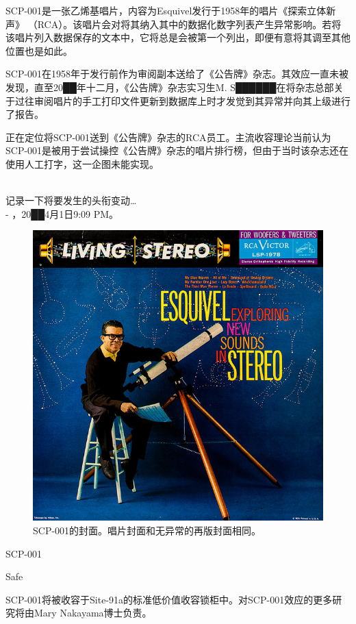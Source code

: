 SCP-001是一张乙烯基唱片，内容为Esquivel发行于1958年的唱片《探索立体新声》 （RCA）。该唱片会对将其纳入其中的数据化数字列表产生异常影响。若将该唱片列入数据保存的文本中，它将总是会被第一个列出，即便有意将其调至其他位置也是如此。

SCP-001在1958年于发行前作为审阅副本送给了《公告牌》杂志。其效应一直未被发现，直至20██年十二月，《公告牌》杂志实习生M. S██████在将杂志总部关于过往审阅唱片的手工打印文件更新到数据库上时才发觉到其异常并向其上级进行了报告。

正在定位将SCP-001送到《公告牌》杂志的RCA员工。主流收容理论当前认为SCP-001是被用于尝试操控《公告牌》杂志的唱片排行榜，但由于当时该杂志还在使用人工打字，这一企图未能实现。


\newpage



\begin{scpbox}
 \\
记录一下将要发生的头衔变动… \\
- ，20██4月1日9:09 PM。
\end{scpbox}

\begin{figure}[H]
	\centering
	\includegraphics[width=0.5\linewidth]{images/SCP-001-a-record-2.jpg}
	\caption*{SCP-001的封面。唱片封面和无异常的再版封面相同。}
\end{figure}

SCP-001

Safe

SCP-001将被收容于Site-91a的标准低价值收容锁柜中。对SCP-001效应的更多研究将由Mary Nakayama博士负责。


